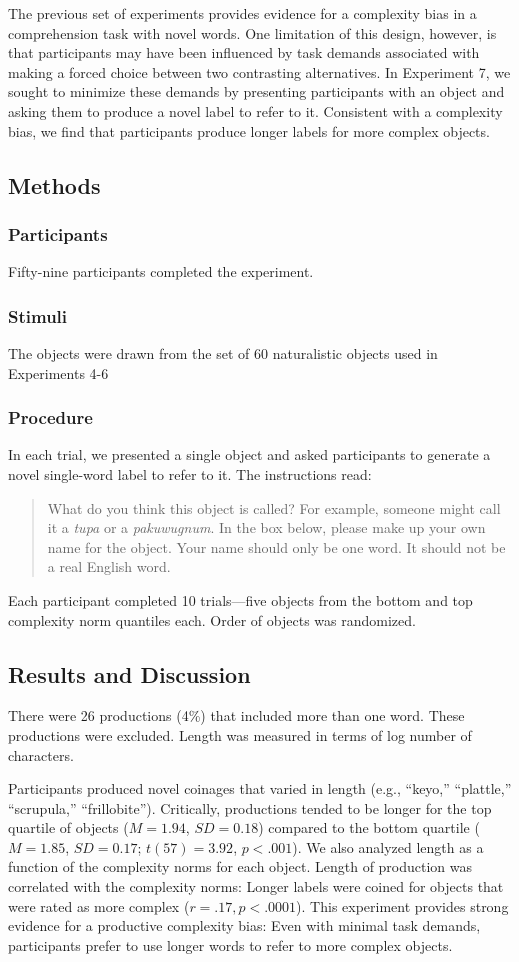 \documentclass[man]{apa2}
\begin{document}
The previous set of experiments provides evidence for a complexity bias in a comprehension task with novel words. One limitation of this design, however, is that participants may have been influenced by task demands associated with making a forced choice between two contrasting alternatives. In Experiment 7, we sought to minimize these demands by presenting participants with an object and asking them to produce a novel label to refer to it. Consistent with a complexity bias, we find that participants produce longer labels for more complex objects. 

\subsection{Methods}
\subsubsection{Participants} Fifty-nine participants completed the experiment.
\subsubsection{Stimuli} The objects were drawn from the set of 60 naturalistic objects used in Experiments 4-6
\subsubsection{Procedure}
In each trial, we presented a single object and asked participants to generate a novel single-word label to refer to it. The instructions read: 

\begin{quote}
What do you think this object is called? For example, someone might call it a {\it tupa} or a {\it pakuwugnum}. In the box below, please make up your own name for the object. Your name should only be one word. It should not be a real English word. 
\end{quote}
Each participant completed 10 trials---five objects from the bottom and top complexity norm quantiles each. Order of objects was randomized.

\subsection{Results and Discussion}
There were 26 productions (4\%) that included more than one word. These productions were excluded. Length was measured in terms of log number of characters.

Participants produced novel coinages that varied in length (e.g., ``keyo,'' ``plattle,'' ``scrupula,'' ``frillobite''). Critically, productions tended to be longer for the top quartile of objects ($M = 1.94$, $SD = 0.18$) compared to the bottom quartile ($M = 1.85$, $SD = 0.17$; $t(57) = 3.92$, $p < .001$). We also analyzed length as a function of the complexity norms for each object. Length of production was correlated with the complexity norms: Longer labels were coined for objects that were rated as more complex ($r=.17, p<.0001$). This experiment provides strong evidence for a productive complexity bias: Even with minimal task demands, participants prefer to use longer words to refer to more complex objects. 
\end{document}
